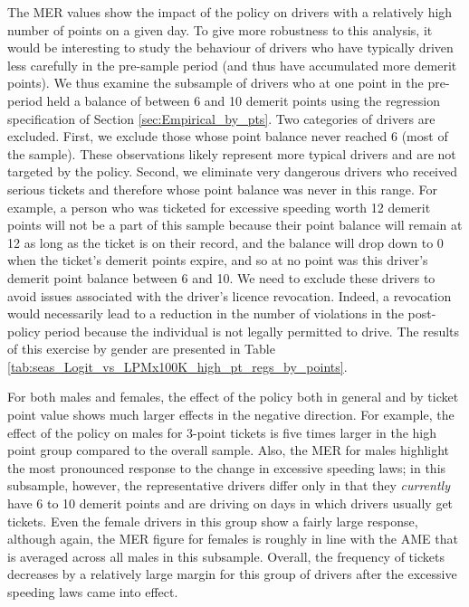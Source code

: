 The MER values show the impact of the policy on drivers with a relatively high number of points on a given day. To give more robustness to this analysis, it would be interesting to study the behaviour of drivers who have typically driven less carefully in the pre-sample period
(and thus have accumulated more demerit points). 
We thus examine the subsample of drivers who at one point in the pre-period 
held a balance of between 6 and 10 demerit points 
using the regression specification of 
Section \ref{sec:Empirical_by_pts}. 
Two categories of drivers are excluded. First, we exclude 
those whose point balance never reached 6 (most of the sample). These observations likely represent more typical drivers and are not targeted by the policy. Second, we eliminate very dangerous drivers who received serious tickets and therefore whose point balance was never in this range.
For example, a person who was ticketed for excessive speeding worth 12 demerit points 
will not be a part of this sample because their point balance will remain at 12 
as long as the ticket is on their record, 
and the balance will drop down to 0 when the ticket’s demerit points expire, and so at no point was this driver’s demerit point balance between 6 and 10. 
We need to exclude these drivers to avoid issues associated with the driver’s licence revocation. 
Indeed, a revocation would necessarily lead to a reduction in the number of violations 
in the post-policy period because the individual is not legally permitted to drive. 
The results of this exercise by gender are presented in 
Table \ref{tab:seas_Logit_vs_LPMx100K_high_pt_regs_by_points}. 

For both males and females, 
the effect of the policy both in general and by ticket point value 
shows much larger effects in the negative direction. 
For example, the effect of the policy on males for 3-point tickets is five times larger 
in the high point group compared to the overall sample. 
% 
Also, the MER for males highlight the most pronounced response to the
change in excessive speeding laws; 
in this subsample, however, the representative drivers differ only 
in that they \emph{currently} have 6 to 10 demerit points 
and are driving on days in which drivers usually get tickets.  
% 
Even the female drivers in this group show a fairly large response, 
although again, the MER figure for females is roughly in line with 
the AME that is averaged across all males in this subsample. 
% 
Overall, the frequency of tickets decreases by a relatively large margin 
for this group of drivers after the excessive speeding laws came into effect.



